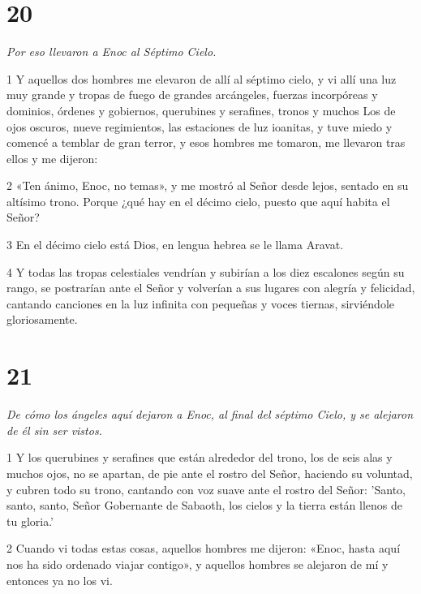 \chapter{20}

\par \textit{Por eso llevaron a Enoc al Séptimo Cielo.}

\par 1 Y aquellos dos hombres me elevaron de allí al séptimo cielo, y vi allí una luz muy grande y tropas de fuego de grandes arcángeles, fuerzas incorpóreas y dominios, órdenes y gobiernos, querubines y serafines, tronos y muchos Los de ojos oscuros, nueve regimientos, las estaciones de luz ioanitas, y tuve miedo y comencé a temblar de gran terror, y esos hombres me tomaron, me llevaron tras ellos y me dijeron:

\par 2 «Ten ánimo, Enoc, no temas», y me mostró al Señor desde lejos, sentado en su altísimo trono. Porque ¿qué hay en el décimo cielo, puesto que aquí habita el Señor?

\par 3 En el décimo cielo está Dios, en lengua hebrea se le llama Aravat.

\par 4 Y todas las tropas celestiales vendrían y subirían a los diez escalones según su rango, se postrarían ante el Señor y volverían a sus lugares con alegría y felicidad, cantando canciones en la luz infinita con pequeñas y voces tiernas, sirviéndole gloriosamente.

\chapter{21}

\par \textit{De cómo los ángeles aquí dejaron a Enoc, al final del séptimo Cielo, y se alejaron de él sin ser vistos.}

\par 1 Y los querubines y serafines que están alrededor del trono, los de seis alas y muchos ojos, no se apartan, de pie ante el rostro del Señor, haciendo su voluntad, y cubren todo su trono, cantando con voz suave ante el rostro del Señor: 'Santo, santo, santo, Señor Gobernante de Sabaoth, los cielos y la tierra están llenos de tu gloria.'

\par 2 Cuando vi todas estas cosas, aquellos hombres me dijeron: «Enoc, hasta aquí nos ha sido ordenado viajar contigo», y aquellos hombres se alejaron de mí y entonces ya no los vi.

